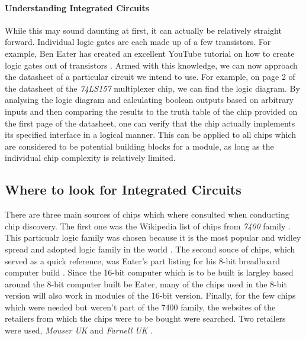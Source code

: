 \paragraph{Understanding Integrated Circuits}
While this may sound daunting at first, it can actually be relatively straight forward. Individual logic gates are each made up of
a few transistors. For example, Ben Eater has created an excellent YouTube tutorial on how to create logic gates out of transistors
\cite{eater2015logicgates}. Armed with this knowledge, we can now approach the datasheet of a particular circuit we intend to use.
For example, on page 2 of the datasheet of the \emph{74LS157} \cite{74ls157} multiplexer chip, we can find the logic diagram.
By analysing the logic diagram and calculating boolean outputs based on arbitrary inputs and then comparing the results
to the truth table of the chip provided on the first page of the datasheet, one can verify that the chip actually implements its
specified interface in a logical manner. This can be applied to all chips which are considered to be potential building blocks
for a module, as long as the individual chip complexity is relatively limited.

\subsection{Where to look for Integrated Circuits}
There are three main sources of chips which where consulted when conducting chip discovery. The first one was the Wikipedia list
of chips from \emph{7400} family \cite{wikipedia74lslist}. This particualr logic family was chosen because it is the most popular
and widley spread and adopted logic family in the world \cite{wikipedia74ls}. The second souce of chips, which served as a quick
reference, was Eater's part listing for his 8-bit breadboard computer build \cite{eater2020parts}. Since the 16-bit computer which
is to be built is largley based around the 8-bit computer built be Eater, many of the chips used in the 8-bit version will also
work in modules of the 16-bit version. Finally, for the few chips which were needed but weren't part of the 7400 family,
the websites of the retailers from which the chips were to be bought were searched. Two retailers were used, \emph{Mouser UK}
\cite{mouser} and \emph{Farnell UK} \cite{farnell}.

